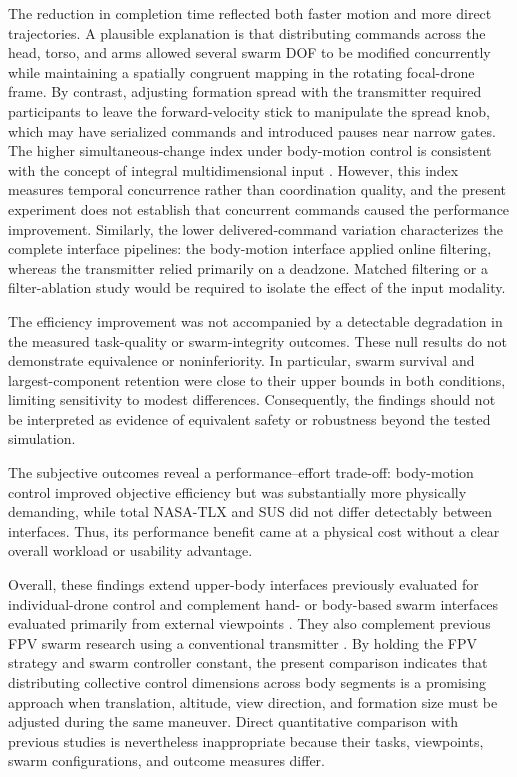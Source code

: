 \documentclass[conference, a4paper]{IEEEtran}
\begin{document}
The reduction in completion time reflected both faster motion and more direct
trajectories. A plausible explanation is that distributing commands across the
head, torso, and arms allowed several swarm DOF to be modified concurrently
while maintaining a spatially congruent mapping in the rotating focal-drone
frame. By contrast, adjusting formation spread with the transmitter required
participants to leave the forward-velocity stick to manipulate the spread
knob, which may have serialized commands and introduced pauses near narrow
gates. The higher simultaneous-change index under body-motion control is
consistent with the concept of integral multidimensional input
\cite{jacob1994integrality,zhai1998quantifying}. However, this index measures
temporal concurrence rather than coordination quality, and the present
experiment does not establish that concurrent commands caused the performance
improvement. Similarly, the lower delivered-command variation characterizes
the complete interface pipelines: the body-motion interface applied online
filtering, whereas the transmitter relied primarily on a deadzone. Matched
filtering or a filter-ablation study would be required to isolate the effect of
the input modality.

The efficiency improvement was not accompanied by a detectable degradation in
the measured task-quality or swarm-integrity outcomes. These null results do
not demonstrate equivalence or noninferiority. In particular, swarm survival
and largest-component retention were close to their upper bounds in both
conditions, limiting sensitivity to modest differences. Consequently, the
findings should not be interpreted as evidence of equivalent safety or
robustness beyond the tested simulation.

The subjective outcomes reveal a performance--effort trade-off: body-motion
control improved objective efficiency but was substantially more physically
demanding, while total NASA-TLX and SUS did not differ detectably between
interfaces. Thus, its performance benefit came at a physical cost without a
clear overall workload or usability advantage.

Overall, these findings extend upper-body interfaces previously evaluated for
individual-drone control
\cite{rognon2018flyjacket,miehlbradt2018datadriven,macchini2024datadriven, tsykunov2019swarmtouch,kratky2025gesture}
and complement hand- or body-based swarm interfaces evaluated primarily from
external viewpoints
\cite{macchini2021personalized,tsykunov2019swarmtouch}. They also complement
previous FPV swarm research using a conventional transmitter
\cite{ben_focaldrone}. By holding the FPV strategy and swarm controller
constant, the present comparison indicates that distributing collective
control dimensions across body segments is a promising approach when
translation, altitude, view direction, and formation size must be adjusted
during the same maneuver. Direct quantitative comparison with previous studies
is nevertheless inappropriate because their tasks, viewpoints, swarm
configurations, and outcome measures differ.
\end{document}
